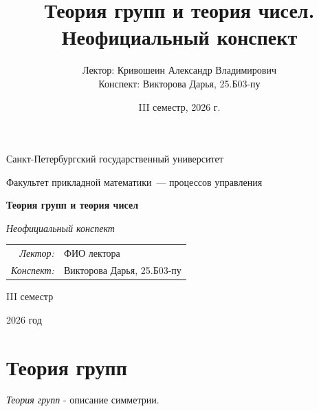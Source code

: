 \documentclass[12pt,a4paper]{report}
\title{Теория групп и теория чисел. Неофициальный конспект}
\author{Лектор: Кривошеин Александр Владимирович\\
Конспект: Викторова Дарья, 25.Б03-пу}
\date{III семестр, 2026 г.}
\begin{document}
\begin{titlepage}
    \thispagestyle{empty}
    \begin{center}
        \vspace*{0.6cm}

        {\large Санкт-Петербургский государственный университет\par}
        \vspace{0.35em}
        {\normalsize Факультет прикладной математики~--- процессов управления\par}

        \vspace*{5.1cm}

        {\fontsize{30}{35}\selectfont\bfseries Теория групп и теория чисел\par}
        \vspace{0.65em}
        {\fontsize{17}{21}\selectfont\itshape Неофициальный конспект\par}

        \vspace{2.7cm}

        {\normalsize
        \begin{tabular}{@{}rl@{}}
            \textit{Лектор:} & ФИО лектора \\
            \textit{Конспект:} & Викторова Дарья, 25.Б03-пу
        \end{tabular}\par}

        \vfill

        {\large III семестр\par}
        \vspace{0.22em}
        {\large 2026 год\par}
        \vspace*{0.55cm}
    \end{center}
\end{titlepage}

\tableofcontents
\newpage

\setcounter{lection}{0}


\chapter{Теория групп}

\textit{Теория групп} - описание симметрии.

\end{document}
